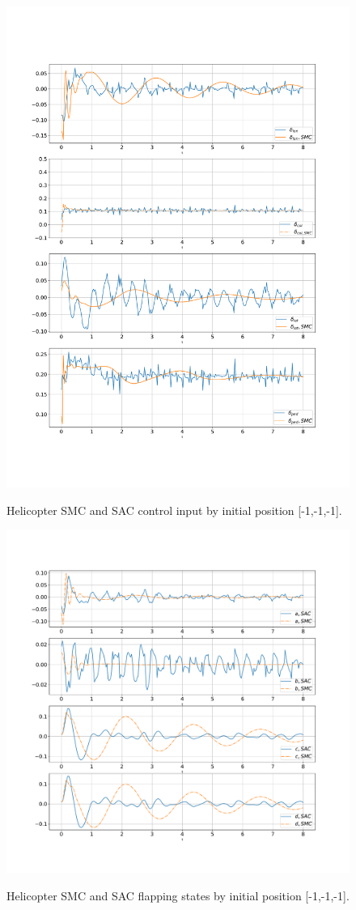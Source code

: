 \begin{figure}
	\begin{center}
		{\includegraphics[scale=0.41]{col.pdf}}
		\caption{Helicopter SMC and SAC control input by initial position [-1,-1,-1].}
		\label{actions_delta}
	\end{center}
\end{figure}

\begin{figure}
	\begin{center}
		{\includegraphics[scale=0.41]{flapping.pdf}}
		\caption{Helicopter SMC and SAC flapping states by initial position [-1,-1,-1].}
		\label{flapping}
	\end{center}
\end{figure}